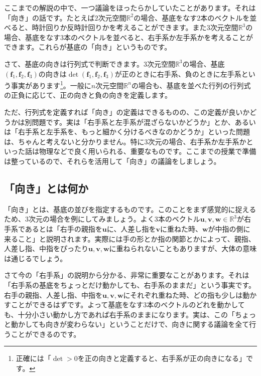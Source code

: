 ここまでの解説の中で、一つ議論をほったらかしていたことがあります。それは「向き」の話です。たとえば$2$次元空間$\mathbb{R}^2$の場合、基底をなす$2$本のベクトルを並べると、時計回りか反時計回りかを考えることができます。また$3$次元空間$\mathbb{R}^3$の場合、基底をなす$3$本のベクトルを並べると、右手系か左手系かを考えることができます。これらが基底の「向き」というものです。

さて、基底の向きは行列式で判断できます。$3$次元空間$\mathbb{R}^3$の場合、基底$(\bm{f}_1, \bm{f}_2, \bm{f}_3)$の向きは$\det(\bm{f}_1, \bm{f}_2, \bm{f}_3)$が正のときに右手系、負のときに左手系という事実があります\footnote{正確には「$\det > 0$を正の向きと定義すると、右手系が正の向きになる」です。}。一般に$n$次元空間$\mathbb{R}^n$の場合も、基底を並べた行列の行列式の正負に応じて、正の向きと負の向きを定義します。

ただ、行列式を定義すれば「向き」の定義はできるものの、この定義が良いかどうかは別問題です。実は「右手系と左手系が混ざらないかどうか」とか、あるいは「右手系と左手系を、もっと細かく分けるべきなのかどうか」といった問題は、ちゃんと考えないと分かりません。特に$3$次元の場合、右手系か左手系かといった話は物理などで良く用いられる、重要なものです。ここまでの授業で準備は整っているので、それらを活用して「向き」の議論をしましょう。

\subsection{「向き」とは何か}

「向き」とは、基底の並びを指定するものです。このことをまず感覚的に捉えるため、$3$次元の場合を例にしてみましょう。よく$3$本のベクトル$\bm{u}, \bm{v}, \bm{w} \in \mathbb{R}^3$が右手系であるとは「右手の親指を$\bm{u}$に、人差し指を$\bm{v}$に重ねた時、$\bm{w}$が中指の側に来ること」と説明されます。実際には手の形とか指の関節とかによって、親指、人差し指、中指をぴったり$\bm{u}, \bm{v}, \bm{w}$に重ねられないこともありますが、大体の意味は通じるでしょう。

さて今の「右手系」の説明から分かる、非常に重要なことがあります。それは「右手系の基底をちょっとだけ動かしても、右手系のままだ」という事実です。右手の親指、人差し指、中指を$\bm{u}, \bm{v}, \bm{w}$にそれぞれ重ねた時、どの指も少しは動かすことができるはずです。よって基底をなす$3$本のベクトルのどれを動かしても、十分小さい動かし方であれば右手系のままになります。実は、この「ちょっと動かしても向きが変わらない」ということだけで、向きに関する議論を全て行うことができるのです。


